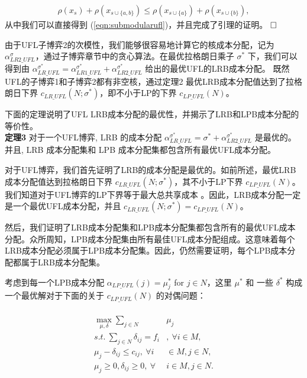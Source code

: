 \documentclass[UTF8]{article}
\begin{document}
\begin{定义}
      \begin{eqnarray*}
        \rho(x_s) + \rho(x_{s\cup \{a,b\}}) \leq \rho(x_{s\cup\{a\}}) + \rho(x_{s\cup \{b\}}),
      \end{eqnarray*}
      从中我们可以直接得到 (\ref{eqn:submodularufl})，并且完成了引理的证明。
      $\hfill\square$

      由于UFL子博弈2的次模性，我们能够很容易地计算它的核成本分配，记为 $\alpha_{LR2\_UFL}^{\sigma}$，通过子博弈章节中的贪心算法。在最优拉格朗日乘子 $\sigma^*$ 下，我们可以得到由 $\alpha_{LR\_UFL}^{\sigma^*} = \alpha_{LR1\_UFL}^{\sigma^*} + \alpha_{LR2\_UFL}^{\sigma^*}$ 给出的最优UFL的LRB成本分配。
      既然UFL的子博弈1和子博弈2都有非空核，通过定理2 最优LRB成本分配值达到了拉格朗日下界 $c_{LR\_UFL}(N;\sigma^*)$，即不小于LP的下界 $c_{LP\_UFL}(N)$。

      下面的定理说明了UFL LRB成本分配的最优性，并揭示了LRB和LPB成本分配的等价性。\\

      \textbf{定理3}
      对于一个UFL博弈, LRB 的成本分配 $\alpha_{LR\_UFL}^{\sigma^*} = \sigma^* + \alpha_{LR2\_UFL}^{\sigma^*}$ 是最优的。 并且, LRB 成本分配集和 LPB 成本分配集都包含所有最优UFL成本分配。



      对于UFL博弈，我们首先证明了LRB的成本分配是最优的。如前所述，最优LRB成本分配值达到拉格朗日下界 $c_{LR\_UFL}(N;\sigma^*)$，其不小于LP下界 $c_{LP\_UFL}(N)$。
      我们知道对于UFL博弈的LP下界等于最大总共享成本 \citep{Kolen1983FacilityLocationGame,Goemans2000FacilityLocationGames}。因此，LRB成本分配一定是一个最优UFL成本分配，并且 $c_{LR\_UFL}(N;\sigma^*)=c_{LP\_UFL}(N)$。

      然后，我们证明了LRB成本分配集和LPB成本分配集都包含所有的最优UFL成本分配。众所周知，LPB成本分配集由所有最佳UFL成本分配\citep{Goemans2000FacilityLocationGames}组成。这意味着每个LRB成本分配必须属于LPB成本分配集。因此，仍然需要证明，每个LPB成本分配都属于LRB成本分配集。

      考虑到每一个LPB成本分配 $\alpha_{LP\_UFL}(j)=\mu^*_j$ for $j \in N$，这里 $\mu^*$ 和 一些 $\delta^*$ 构成一个最优解对于下面的关于 $c_{LP\_UFL}(N)$ 的对偶问题：

      \begin{eqnarray*}
      \begin{aligned}
      \begin{split}\label{eqn:UFLLRdual1}
       \max_{\mu,\delta} \sum_{j \in N}&\mu_j\\
      s.t.~\sum_{j \in N}\delta_{ij} = f_i&, ~\forall i \in M,\\
      \mu_j - \delta_{ij} \leq c_{ij}, ~\forall i& \in M, j \in N,\\
       \mu_j \geq 0, \delta_{ij} \geq 0,~\forall &i \in M, j \in N.
      \end{split}
      \end{aligned}
      \end{eqnarray*}


\end{定义}
\end{document}
